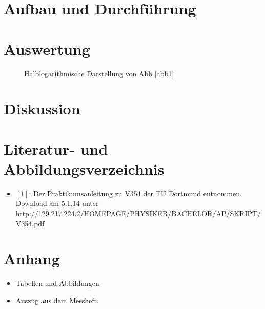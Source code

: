 \documentclass[11pt,ngerman,a4paper]{article}
\begin{document}
\section{Aufbau und Durchf\"{u}hrung}

\section{Auswertung}

\begin{figure}[h!]
\centering
\caption{Halblogarithmische Darstellung von Abb \ref{abb1}}
\label{abb2}
\end{figure}

\section{Diskussion}

\section{Literatur- und Abbildungsverzeichnis}
\begin{itemize}
\item $[1]$: Der Praktikumsanleitung zu V354 der TU Dortmund entnommen. Download am 5.1.14 unter \newline http://129.217.224.2/HOMEPAGE/PHYSIKER/BACHELOR/AP/SKRIPT/V354.pdf
\end{itemize}
\section{Anhang}
\begin{itemize}
\item Tabellen und Abbildungen
\item Auszug aus dem Messheft.


\end{itemize}
\end{document}
